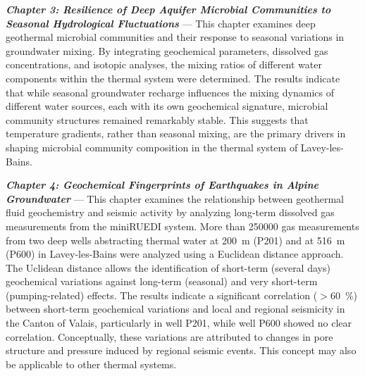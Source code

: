 \textbf{\textit{Chapter 3: Resilience of Deep Aquifer Microbial Communities to Seasonal Hydrological Fluctuations}} --- This chapter examines deep geothermal microbial communities and their response to seasonal variations in groundwater mixing.
By integrating geochemical parameters, dissolved gas concentrations, and isotopic analyses, the mixing ratios of different water components within the thermal system were determined.
The results indicate that while seasonal groundwater recharge influences the mixing dynamics of different water sources, each with its own geochemical signature, microbial community structures remained remarkably stable.
This suggests that temperature gradients, rather than seasonal mixing, are the primary drivers in shaping microbial community composition in the thermal system of Lavey-les-Bains.\vspace{10pt}

\textbf{\textit{Chapter 4: Geochemical Fingerprints of Earthquakes in Alpine Groundwater}} --- This chapter examines the relationship between geothermal fluid geochemistry and seismic activity by analyzing long-term dissolved gas measurements from the miniRUEDI system.
More than \num{250000} gas measurements from two deep wells abstracting thermal water at \SI{200}{\metre} (P201) and at \SI{516}{\metre} (P600) in Lavey-les-Bains were analyzed using a Euclidean distance approach.
The Uclidean distance allows the identification of short-term (several days) geochemical variations against long-term (seasonal) and very short-term (pumping-related) effects.
The results indicate a significant correlation ($>$\SI{60}{\percent}) between short-term geochemical variations and local and regional seismicity in the Canton of Valais, particularly in well P201, while well P600 showed no clear correlation.
Conceptually, these variations are attributed to changes in pore structure and pressure induced by regional seismic events.
This concept may also be applicable to other thermal systems.
